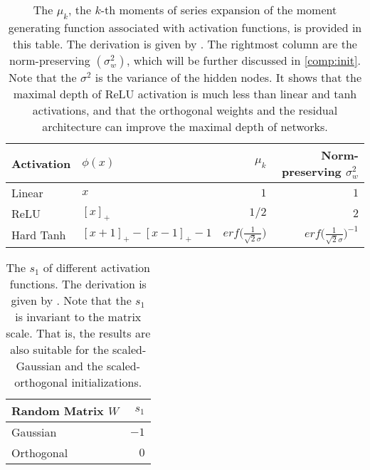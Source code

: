 \begin{table}[h]
    \centering
    \begin{tabular}{|l|l|r|r|}
    \hline
        Activation & $\phi(x)$ & $\mu_k$ & Norm-preserving $\sigma_w^2$\\\hline
        Linear & $x$ & $1$ & $1$\\\hline
        ReLU & $[x]_{+}$ & $1/2$ & $2$\\\hline
        Hard Tanh & $[x+1]_{+}-[x-1]_{+}-1$ & $erf\Big(\frac{1}{\sqrt{2}\sigma}\Big)$
        & $erf\Big(\frac{1}{\sqrt{2}\sigma}\Big)^{-1}$\\\hline
    \end{tabular}
    \caption[The $\mu_k$ of different activation functions.]
    {The $\mu_k$, the $k$-th moments of series expansion of the moment generating function
    associated with activation functions, is provided in this table.
    The derivation is given by \cite{mft:spectral}.
    The rightmost column are the norm-preserving $(\sigma_w^2)$, which will be further
    discussed in \ref{comp:init}.
    Note that the $\sigma^2$ is the variance of the hidden nodes.
    It shows that the maximal depth of ReLU activation is much less than linear and tanh
    activations, and that the orthogonal weights and the residual architecture can improve
    the maximal depth of networks.}
    \label{table:mu}
\end{table}


\begin{table}[h]
    \centering
    \begin{tabular}{|l|r|}
    \hline
        Random Matrix $W$ & $s_1$\\\hline
        Gaussian & $-1$\\\hline
        Orthogonal & $0$\\\hline
    \end{tabular}
    \caption[The $s_1$ of different weight distribution.]
    {The $s_1$ of different activation functions.
    The derivation is given by \cite{mft:spectral}.
    Note that the $s_1$ is invariant to the matrix scale. That is, the results are also
    suitable for the scaled-Gaussian and the scaled-orthogonal initializations.}
    \label{table:s}
\end{table}

